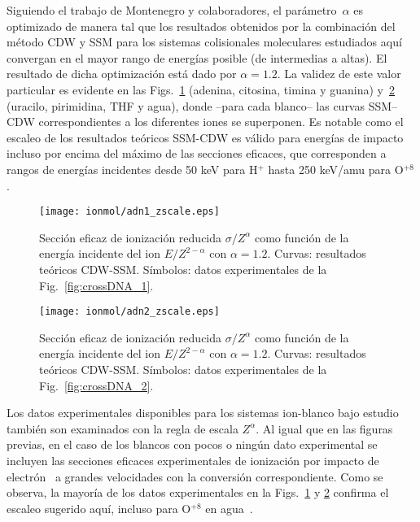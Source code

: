 Siguiendo el trabajo de Montenegro y colaboradores, el 
parámetro~$\alpha$ es optimizado de manera tal que los resultados 
obtenidos por la combinación del método CDW y SSM para los sistemas 
colisionales moleculares estudiados aquí convergan en el mayor rango de 
energías posible (de intermedias a altas). El resultado de dicha 
optimización está dado por $\alpha=1.2$. La validez de este valor 
particular es evidente en las Figs.~\ref{fig:zreduced-adn1} (adenina, 
citosina, timina y guanina) y~\ref{fig:zreduced-adn2} (uracilo, 
pirimidina, THF y agua), donde --para cada blanco-- las curvas SSM--CDW 
correspondientes a los diferentes iones se superponen. Es notable como 
el escaleo de los resultados teóricos SSM-CDW es válido para energías de 
impacto incluso por encima del máximo de las secciones eficaces, que 
corresponden a rangos de energías incidentes desde 50 keV para H$^+$ 
hasta 250 keV/amu para O$^{+8}$.

\begin{figure}
\centering
\texttt{[image: ionmol/adn1\_zscale.eps]}
\caption[Sección eficaz de ionización reducida por $Z$ y $\alpha$ 
(Parte I).]
{Sección eficaz de ionización reducida $\sigma/Z^{\alpha}$ como función
de la energía incidente del ion $E/Z^{2-\alpha}$ con $\alpha=1.2$. 
Curvas: resultados teóricos CDW-SSM. 
Símbolos: datos experimentales de la Fig.~\ref{fig:crossDNA_1}.}
\label{fig:zreduced-adn1}
\end{figure} 

\begin{figure}
\centering
\texttt{[image: ionmol/adn2\_zscale.eps]}
\caption[Sección eficaz de ionización reducida por $Z$ y $\alpha$ 
(Parte II).]
{Sección eficaz de ionización reducida $\sigma/Z^{\alpha}$ como función
de la energía incidente del ion $E/Z^{2-\alpha}$ con $\alpha=1.2$. 
Curvas: resultados teóricos CDW-SSM. 
Símbolos: datos experimentales de la Fig.~\ref{fig:crossDNA_2}.}
\label{fig:zreduced-adn2}
\end{figure} 

Los datos experimentales disponibles para los sistemas ion-blanco bajo 
estudio~\cite{Iriki:11,Sens:20,Bhattacharjee:19,itoh2013,wolff2014,
wang2016,agnihotri2012,agnihotri2013,Luna2007,Bolorizadeh86,H_Rudd85,
He_Rudd85,toburen80,Ohsawa05,Bhattacharjee:17,DalCappello:09,
Bhattacharjee:16} también son examinados con la regla de escala 
$Z^\alpha$. Al igual que en las figuras previas, en el caso de los 
blancos con pocos o ningún dato experimental se incluyen las secciones 
eficaces experimentales de ionización por impacto de 
electrón~\cite{Rahman:16,bug2017,wolf2019,fuss2009} a grandes 
velocidades con la conversión correspondiente. Como se observa, la 
mayoría de los datos experimentales en la Figs.~\ref{fig:zreduced-adn1} 
y \ref{fig:zreduced-adn2} confirma el escaleo sugerido aquí, incluso 
para O$^{+8}$ en agua~\cite{Bhattacharjee:16}. 

